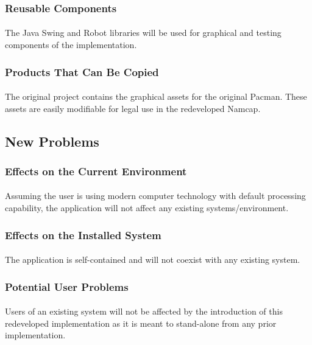 \documentclass[12pt, titlepage]{article}
\begin{document}
\subsubsection{Reusable Components}
\paragraph{}
The Java Swing and Robot libraries will be used for graphical and testing components of the implementation.

\subsubsection{Products That Can Be Copied}
\paragraph{}
The original project contains the graphical assets for the original Pacman. These assets are easily modifiable for legal use in the redeveloped Namcap.

\subsection{New Problems}

\subsubsection{Effects on the Current Environment}
\paragraph{}
Assuming the user is using modern computer technology with default processing capability, the application will not affect any existing systems/environment.

\subsubsection{Effects on the Installed System}
\paragraph{}
The application is self-contained and will not coexist with any existing system.

\subsubsection{Potential User Problems}
\paragraph{}
Users of an existing system will not be affected by the introduction of this redeveloped implementation as it is meant to stand-alone from any prior implementation.
\end{document}
